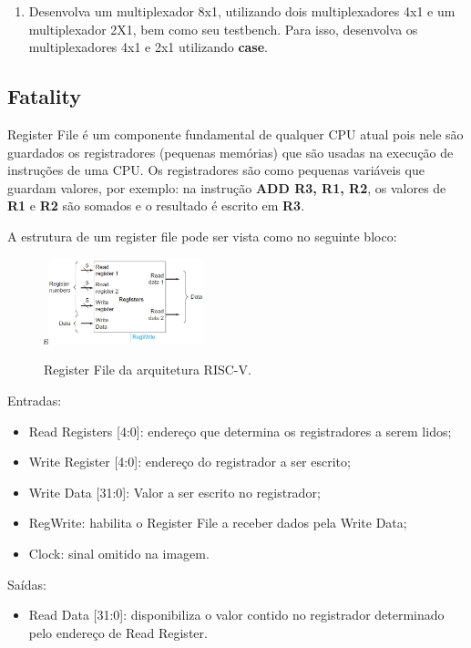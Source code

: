 \documentclass[a4paper]{article}
\begin{document}
\begin{enumerate}

\item Desenvolva um multiplexador 8x1, utilizando dois multiplexadores 4x1 e um multiplexador 2X1, bem como seu testbench. Para isso, desenvolva os multiplexadores 4x1 e 2x1 utilizando \textbf{case}.

\end{enumerate}

\subsection*{Fatality}

Register File é um componente fundamental de qualquer CPU atual pois nele são guardados os registradores (pequenas memórias) que são usadas na execução de instruções de uma CPU. Os registradores são como pequenas variáveis que guardam valores, por exemplo: na instrução \textbf{ADD R3, R1, R2}, os valores de \textbf{R1} e \textbf{R2} são somados e o resultado é escrito em \textbf{R3}.

A estrutura de um register file pode ser vista como no seguinte bloco: 
\begin{figure}[H]
\centering
s\includegraphics[width=0.4\textwidth]{images/registerfile.jpg}
\caption*{Register File da arquitetura RISC-V.}
\end{figure}
Entradas:
	\begin{itemize}
	\item Read Registers [4:0]: endereço que determina os registradores a serem lidos;
    \item Write Register [4:0]: endereço do registrador a ser escrito;
    \item Write Data [31:0]: Valor a ser escrito no registrador;
    \item RegWrite: habilita o Register File a receber dados pela Write Data;
    \item Clock: sinal omitido na imagem.
	\end{itemize}

Saídas:
	\begin{itemize}
    \item Read Data [31:0]: disponibiliza o valor contido no registrador determinado pelo endereço de Read Register.
    \end{itemize}
    
\end{document}
